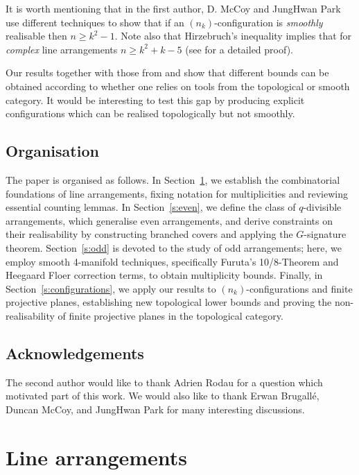 \documentclass[a4paper,12pt, onesided]{amsart}
\theoremstyle{remark}
\numberwithin{figure}{section}
\numberwithin{equation}{section}
\begin{document}
It is worth mentioning that in \cite{Aceto-McCoy-Park:2026} the first author, D. McCoy and JungHwan Park use different techniques to show that if an $(n_k)$-configuration is \emph{smoothly} realisable then $n\geq k^2-1$.
Note also that Hirzebruch's inequality implies that for \emph{complex} line arrangements $n \ge k^2+k-5$ (see \cite[Proposition 5.1]{Aceto-McCoy-Park:2026} for a detailed proof).

Our results together with those from \cite{Ruberman-Starkston:2016} and \cite{Aceto-McCoy-Park:2026} show that different bounds can be obtained according to whether one relies on tools from the topological or smooth category. It would be interesting to test this gap by producing explicit configurations which can be realised topologically but not smoothly. 

\subsection*{Organisation} The paper is organised as follows. In Section~\ref{s:combinatorics}, we establish the combinatorial foundations of line arrangements, fixing notation for multiplicities and reviewing essential counting lemmas. In Section~\ref{s:even},
we define the class of $q$-divisible arrangements, which generalise even arrangements, and derive constraints on their realisability by constructing branched covers and applying the $G$-signature theorem. Section~\ref{s:odd} is devoted to the study of odd arrangements; here, we employ smooth 4-manifold techniques, specifically Furuta's 10/8-Theorem and Heegaard Floer correction terms, to obtain multiplicity bounds. Finally, in Section~\ref{s:configurations}, we apply our results to $(n_k)$-configurations and finite projective planes, establishing new topological lower bounds and proving the non-realisability of finite projective planes in the topological category.

\subsection*{Acknowledgements} The second author would like to thank Adrien Rodau for a question which motivated part of this work. We would also like to thank Erwan Brugall\'e, Duncan McCoy, and JungHwan Park for many interesting discussions.



\section{Line arrangements}\label{s:combinatorics}
\end{document}
